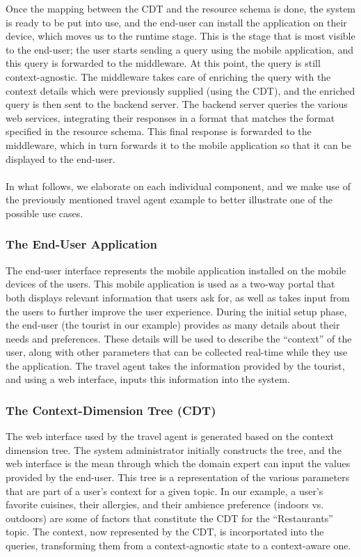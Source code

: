 Once the mapping between the CDT and the resource schema is done, the system is ready to be put into use, and the end-user can install the application on their device, which moves us to the runtime stage. This is the stage that is most visible to the end-user; the user starts sending a query using the mobile application, and this query is forwarded to the middleware. At this point, the query is still context-agnostic. The middleware takes care of enriching the query with the context details which were previously supplied (using the CDT), and the enriched query is then sent to the backend server. The backend server queries the various web services, integrating their responses in a format that matches the format specified in the resource schema. This final response is forwarded to the middleware, which in turn forwards it to the mobile application so that it can be displayed to the end-user.\\\\
In what follows, we elaborate on each individual component, and we make use of the previously mentioned travel agent example to better illustrate one of the possible use cases.\\
\subsubsection{The End-User Application}
The end-user interface represents the mobile application installed on the mobile devices of the users. This mobile application is used as a two-way portal that both displays relevant information that users ask for, as well as takes input from the users to further improve the user experience. During the initial setup phase, the end-user (the tourist in our example) provides as many details about their needs and preferences. These details will be used to describe the ``context'' of the user, along with other parameters that can be collected real-time while they use the application. The travel agent takes the information provided by the tourist, and using a web interface, inputs this information into the system.
\subsubsection{The Context-Dimension Tree (CDT)}
The web interface used by the travel agent is generated based on the context dimension tree. The system administrator initially constructs the tree, and the web interface is the mean through which the domain expert can input the values provided by the end-user. This tree is a representation of the various parameters that are part of a user's context for a given topic. In our example, a user's favorite cuisines, their allergies, and their ambience preference (indoors vs. outdoors) are some of factors that constitute the CDT for the ``Restaurants'' topic. The context, now represented by the CDT, is incorportated into the queries, transforming them from a context-agnostic state to a context-aware one.
